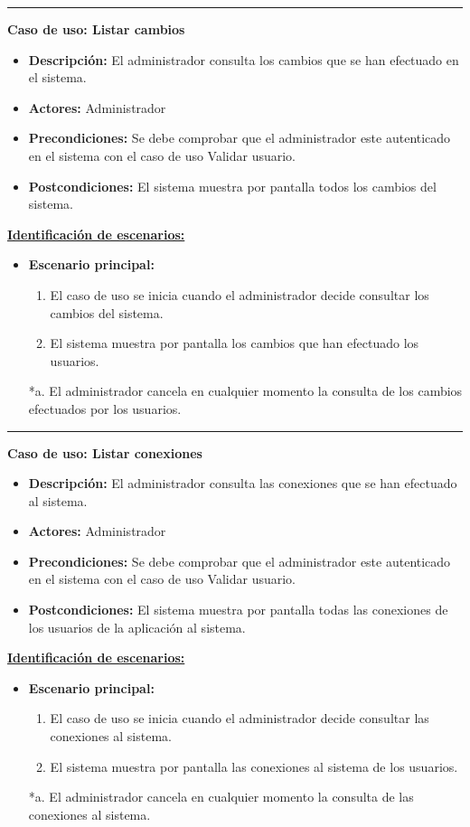 \smallskip
\hrule height 1pt
\smallskip
\textbf{Caso de uso: Listar cambios}
\begin{itemize}\renewcommand{\labelitemi}{$\cdot$}
 \item \textbf{Descripción:} El administrador consulta los cambios que se han efectuado en el sistema.
  \item \textbf{Actores:} Administrador
  \item \textbf{Precondiciones:} Se debe comprobar que el administrador este autenticado en el sistema con el caso de uso Validar usuario.
  \item \textbf{Postcondiciones:} El sistema muestra por pantalla todos los cambios del sistema.
\end{itemize}
\underline{\textbf{Identificación de escenarios:}}
\begin{itemize}\renewcommand{\labelitemi}{$\circ$}
 \item \textbf{Escenario principal:}
         \begin{enumerate}
          \item El caso de uso se inicia cuando el administrador decide consultar los cambios del sistema.
          \item El sistema muestra por pantalla los cambios que han efectuado los usuarios.
         \end{enumerate}
          *a. El administrador cancela en cualquier momento la consulta de los cambios efectuados por los usuarios.
\end{itemize}

\smallskip
\hrule height 1pt
\smallskip
\textbf{Caso de uso: Listar conexiones}
\begin{itemize}\renewcommand{\labelitemi}{$\cdot$}
 \item \textbf{Descripción:} El administrador consulta las conexiones que se han efectuado al sistema.
  \item \textbf{Actores:} Administrador
  \item \textbf{Precondiciones:} Se debe comprobar que el administrador este autenticado en el sistema con el caso de uso Validar usuario.
  \item \textbf{Postcondiciones:} El sistema muestra por pantalla todas las conexiones de los usuarios de la aplicación al sistema.
\end{itemize}
\underline{\textbf{Identificación de escenarios:}}
\begin{itemize}\renewcommand{\labelitemi}{$\circ$}
 \item \textbf{Escenario principal:}
         \begin{enumerate}
          \item El caso de uso se inicia cuando el administrador decide consultar las conexiones al sistema.
          \item El sistema muestra por pantalla las conexiones al sistema de los usuarios.
         \end{enumerate}
          *a. El administrador cancela en cualquier momento la consulta de las conexiones al sistema.
\end{itemize}


